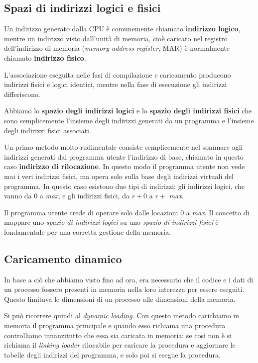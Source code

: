     \subsection{Spazi di indirizzi logici e fisici}
        Un indirizzo generato dalla CPU è comunemente chiamato \textbf{indirizzo logico}, mentre un indirizzo visto dall'unità di memoria, cioè caricato nel registro dell'indirizzo di memoria (\textit{memory address register}, MAR) è normalmente chiamato \textbf{indirizzo fisico}.
        
        L'associazione eseguita nelle fasi di compilazione e caricamento producono indirizzi fisici e logici identici, mentre nella fase di esecuzione gli indirizzi differiscono.
        
        Abbiamo lo \textbf{spazio degli indirizzi logici} e lo \textbf{spazio degli indirizzi fisici} che sono semplicemente l'insieme degli indirizzi generati da un programma e l'insieme degli indirizzi fisici associati.
        
        Un primo metodo molto rudimentale consiste semplicemente nel sommare agli indirizzi generati dal programma utente l'indirizzo di base, chiamato in questo caso \textbf{indirizzo di rilocazione}. In questo modo il programma utente non vede mai i veri indirizzi fisici, ma opera solo sulla base degli indirizzi virtuali del programma. In questo caso esistono due tipi di indirizzi: gli indirizzi logici, che vanno da 0 a \textit{max}, e gli indirizzi fisici, da $r + 0$ a $r +$ \textit{max}.
        
        Il programma utente crede di operare solo dalle locazioni 0 a \textit{max}. Il concetto di mappare uno \textit{spazio di indirizzi logici} su uno \textit{spazio di indirizzi fisici} è fondamentale per una corretta gestione della memoria.
        
    \subsection{Caricamento dinamico}
        In base a ciò che abbiamo visto fino ad ora, era necessario che il codice e i dati di un processo fossero presenti in memoria nella loro interezza per essere eseguiti. Questo limitava le dimensioni di un processo alle dimensioni della memoria.
        
        Si può ricorrere quindi al \textit{dynamic loading}. Con questo metodo carichiamo in memoria il programma principale e quando esso richiama una procedura controlliamo innanzitutto che essa sia caricata in memoria: se così non è si richiama il \textit{linking loader} rilocabile per caricare la procedura e aggiornare le tabelle degli indirizzi del programma, e solo poi si esegue la procedura.
        
